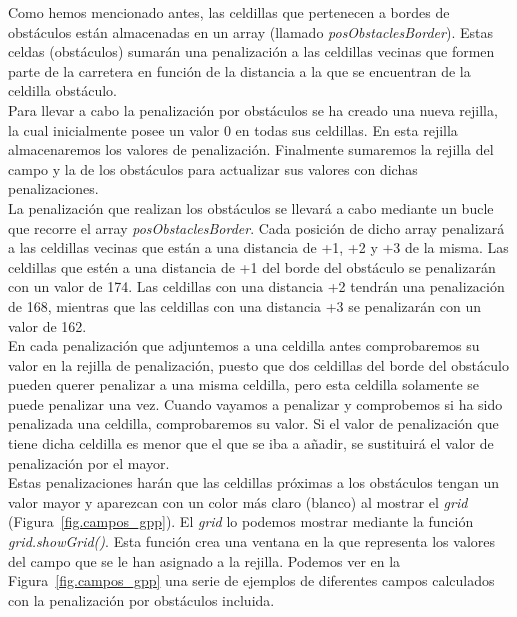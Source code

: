 Como hemos mencionado antes, las celdillas que pertenecen a bordes de obstáculos están almacenadas en un array (llamado \textit{posObstaclesBorder}). Estas celdas (obstáculos) sumarán una penalización a las celdillas vecinas que formen parte de la carretera en función de la distancia a la que se encuentran de la celdilla obstáculo.\\

Para llevar a cabo la penalización por obstáculos se ha creado una nueva rejilla, la cual inicialmente posee un valor 0 en todas sus celdillas. En esta rejilla almacenaremos los valores de penalización. Finalmente sumaremos la rejilla del campo y la de los obstáculos para actualizar sus valores con dichas penalizaciones.\\

La penalización que realizan los obstáculos se llevará a cabo mediante un bucle que recorre el array \textit{posObstaclesBorder}. Cada posición de dicho array penalizará a las celdillas vecinas que están a una distancia de +1, +2 y +3 de la misma. Las celdillas que estén a una distancia de +1 del borde del obstáculo se penalizarán con un valor de 174. Las celdillas con una distancia +2 tendrán una penalización de 168, mientras que las celdillas con una distancia +3 se penalizarán con un valor de 162.\\

En cada penalización que adjuntemos a una celdilla antes comprobaremos su valor en la rejilla de penalización, puesto que dos celdillas del borde del obstáculo pueden querer penalizar a una misma celdilla, pero esta celdilla solamente se puede penalizar una vez. Cuando vayamos a penalizar y comprobemos si ha sido penalizada una celdilla, comprobaremos su valor. Si el valor de penalización que tiene dicha celdilla es menor que el que se iba a añadir, se sustituirá el valor de penalización por el mayor.\\

Estas penalizaciones harán que las celdillas próximas a los obstáculos tengan un valor mayor y aparezcan con un color más claro (blanco) al mostrar el \textit{grid} (Figura~\ref{fig.campos_gpp}). El \textit{grid} lo podemos mostrar mediante la función \textit{grid.showGrid()}. Esta función crea una ventana en la que representa los valores del campo que se le han asignado a la rejilla. Podemos ver en la Figura~\ref{fig.campos_gpp} una serie de ejemplos de diferentes campos calculados con la penalización por obstáculos incluida.\\

